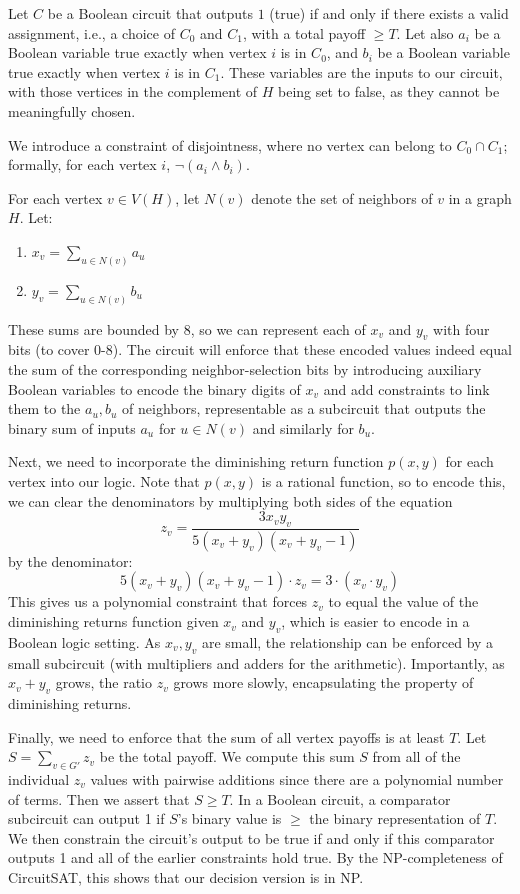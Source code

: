 \documentclass[11pt]{article}
\theoremstyle{plain}
\begin{document}
Let $C$ be a Boolean circuit that outputs $1$ (true) if and only if there exists a valid assignment, i.e., a choice of $C_0$ and $C_1$, with a total payoff $\geq T$. Let also $a_i$ be a Boolean variable true exactly when vertex $i$ is in $C_0$, and $b_i$ be a Boolean variable true exactly when vertex $i$ is in $C_1$. These variables are the inputs to our circuit, with those vertices in the complement of $H$ being set to false, as they cannot be meaningfully chosen.

We introduce a constraint of disjointness, where no vertex can belong to $C_0 \cap C_1$; formally, for each vertex $i$, $\neg (a_i \land b_i)$.

For each vertex $v \in V(H)$, let $N(v)$ denote the set of neighbors of $v$ in a graph $H$. Let:
\begin{enumerate}
    \item $x_v = \sum_{u \in N(v)} a_u$
    \item $y_v = \sum_{u \in N(v)} b_u$
\end{enumerate}

These sums are bounded by 8, so we can represent each of $x_v$ and $y_v$ with four bits (to cover 0-8). The circuit will enforce that these encoded values indeed equal the sum of the corresponding neighbor-selection bits by introducing auxiliary Boolean variables to encode the binary digits of $x_v$ and add constraints to link them to the $a_u, b_u$ of neighbors, representable as a subcircuit that outputs the binary sum of inputs $a_u$ for $u \in N(v)$ and similarly for $b_u$.

Next, we need to incorporate the diminishing return function $p(x,y)$ for each vertex into our logic. Note that $p(x,y)$ is a rational function, so to encode this, we can clear the denominators by multiplying both sides of the equation
\[z_v= \frac{3x_v y_v}{5(x_v+y_v)(x_v+y_v-1)}\]
by the denominator:
\[5(x_v + y_v)(x_v + y_v-1) \cdot z_v = 3 \cdot (x_v \cdot y_v)\]
This gives us a polynomial constraint that forces $z_v$ to equal the value of the diminishing returns function given $x_v$ and $y_v$, which is easier to encode in a Boolean logic setting. As $x_v, y_v$ are small, the relationship can be enforced by a small subcircuit (with multipliers and adders for the arithmetic). Importantly, as $x_v + y_v$ grows, the ratio $z_v$ grows more slowly, encapsulating the property of diminishing returns. 

Finally, we need to enforce that the sum of all vertex payoffs is at least $T$. Let $S = \sum_{v \in G'} z_v$ be the total payoff. We compute this sum $S$ from all of the individual $z_v$ values with pairwise additions since there are a polynomial number of terms. Then we assert that $S \geq T$. In a Boolean circuit, a comparator subcircuit can output 1 if $S$'s binary value is $\geq$ the binary representation of $T$. We then constrain the circuit's output to be true if and only if this comparator outputs 1 and all of the earlier constraints hold true. By the NP-completeness of CircuitSAT, this shows that our decision version is in NP.
\end{document}
